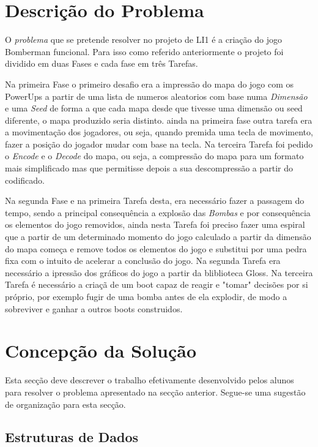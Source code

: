 \documentclass[a4paper]{article}
\begin{document}
\section{Descrição do Problema}
\label{sec:problema}

O \emph{problema} que se pretende resolver no projeto de LI1 é a criação
do jogo Bomberman funcional. Para isso como referido anteriormente o projeto foi 
dividido em duas Fases e cada fase em três Tarefas.

Na primeira Fase o primeiro desafio
era a impressão do mapa do jogo com os PowerUps a partir de uma lista de numeros aleatorios
com base numa \emph{Dimensão} e uma \emph{Seed} de forma a que cada mapa desde que tivesse uma
dimensão ou seed diferente, o mapa produzido seria distinto. ainda na primeira fase outra tarefa 
era a movimentação dos jogadores, ou seja, quando premida uma tecla de movimento, fazer a posição 
do jogador mudar com base na tecla. Na terceira Tarefa foi pedido o \emph{Encode} e o \emph{Decode}
do mapa, ou seja, a compressão do mapa para um formato mais simplificado mas que permitisse depois 
a sua descompressão a partir do codificado.

Na segunda Fase e na primeira Tarefa desta, era necessário fazer a passagem do tempo, sendo
a principal consequência a explosão das \emph{Bombas} e por consequência os elementos do jogo removidos,
ainda nesta Tarefa foi preciso fazer uma espiral que a partir de um determinado momento do jogo calculado 
a partir da dimensão do mapa começa e remove todos os elementos do jogo e substitui por uma pedra fixa 
com o intuito de acelerar a conclusão do jogo. Na segunda Tarefa era necessário a ipressão dos gráficos do
jogo a partir da bliblioteca Gloss. Na terceira Tarefa é necessário a criaçã de um boot capaz de reagir 
e "tomar" decisões por si próprio, por exemplo fugir de uma bomba antes de ela explodir, de modo a 
sobreviver e ganhar a outros boots construidos.


\section{Concepção da Solução}
\label{sec:solucao}

Esta secção deve descrever o trabalho efetivamente desenvolvido pelos
alunos para resolver o problema apresentado na secção
anterior. Segue-se uma sugestão de organização para esta secção.

\subsection{Estruturas de Dados}
\end{document}
